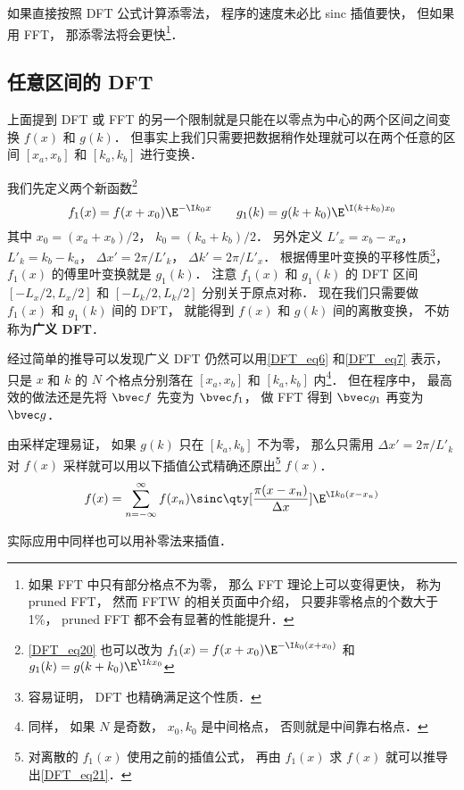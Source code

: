 如果直接按照 DFT 公式计算添零法， 程序的速度未必比 sinc 插值要快， 但如果用 FFT， 那添零法将会更快\footnote{如果 FFT 中只有部分格点不为零， 那么 FFT 理论上可以变得更快， 称为 pruned FFT， 然而 FFTW 的相关页面中介绍， 只要非零格点的个数大于 1\%， pruned FFT 都不会有显著的性能提升．}．

\subsection{任意区间的 DFT}
上面提到 DFT 或 FFT 的另一个限制就是只能在以零点为中心的两个区间之间变换 $f(x)$ 和 $g(k)$． 但事实上我们只需要把数据稍作处理就可以在两个任意的区间 $[x_a, x_b]$ 和 $[k_a, k_b]$ 进行变换．

我们先定义两个新函数\footnote{\autoref{DFT_eq20} 也可以改为 $f_1(x) = f(x + x_0)\E^{-\I k_0 (x+x_0)}$ 和 $g_1(k) = g(k + k_0)\E^{\I k x_0}$}
\begin{equation}\label{DFT_eq20}
f_1(x) = f(x + x_0)\E^{-\I k_0 x} \qquad g_1(k) = g(k + k_0)\E^{\I (k+k_0) x_0}
\end{equation}
其中 $x_0 = (x_a + x_b)/2$，  $k_0 = (k_a + k_b)/2$． 另外定义 $L'_x = x_b - x_a$， $L'_k = k_b-k_a$， $\Delta x' = 2\pi/L'_k$， $\Delta k' = 2\pi/L'_x$． 根据傅里叶变换的平移性质\footnote{容易证明， DFT 也精确满足这个性质．}，%
$f_1(x)$ 的傅里叶变换就是 $g_1(k)$． 注意 $f_1(x)$ 和 $g_1(k)$ 的 DFT 区间 $[-L_x/2, L_x/2]$ 和 $[-L_k/2, L_k/2]$ 分别关于原点对称． 现在我们只需要做 $f_1(x)$ 和 $g_1(k)$ 间的  DFT， 就能得到 $f(x)$ 和 $g(k)$ 间的离散变换， 不妨称为\textbf{广义 DFT}．

经过简单的推导可以发现广义 DFT 仍然可以用\autoref{DFT_eq6} 和\autoref{DFT_eq7} 表示， 只是 $x$ 和 $k$ 的 $N$ 个格点分别落在 $[x_a, x_b]$ 和 $[k_a, k_b]$ 内\footnote{同样， 如果 $N$ 是奇数， $x_0, k_0$ 是中间格点， 否则就是中间靠右格点．}． 但在程序中， 最高效的做法还是先将 $\bvec f$ 先变为 $\bvec f_1$， 做 FFT 得到 $\bvec g_1$ 再变为 $\bvec g$．

由采样定理易证， 如果 $g(k)$ 只在 $[k_a, k_b]$ 不为零， 那么只需用 $\Delta x' = 2\pi/L'_k$ 对 $f(x)$ 采样就可以用以下插值公式精确还原出\footnote{对离散的 $f_1(x)$ 使用之前的插值公式， 再由 $f_1(x)$ 求 $f(x)$ 就可以推导出\autoref{DFT_eq21}．} $f(x)$．
\begin{equation}\label{DFT_eq21}
f(x) = \sum_{n = -\infty}^{\infty} f(x_n)\sinc\qty[\frac{\pi(x - x_n)}{\Delta x}] \E^{\I k_0 (x-x_n)}
\end{equation}

实际应用中同样也可以用补零法来插值．

